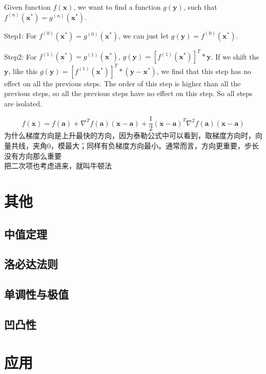 \documentclass[UTF8]{../../09-Mathematics}
\begin{document}
Given function $f(\boldsymbol x)$, we want to find a function $g(\boldsymbol y)$, such that $f^{(n)}(\boldsymbol x^*)=g^{(n)}(\boldsymbol x^*)$.

Step1: For $f^{(0)}(\boldsymbol x^*)=g^{(0)}(\boldsymbol x^*)$, we can just let $g(\boldsymbol y)=f^{(0)}(\boldsymbol x^*)$.

Step2: For $f^{(1)}(\boldsymbol x^*)=g^{(1)}(\boldsymbol x^*)$, $g(\boldsymbol y)=[f^{(1)}(\boldsymbol x^*)]^T *\boldsymbol y$. If we shift the $\boldsymbol y$, like this $g(\boldsymbol y)=[f^{(1)}(\boldsymbol x^*)]^T *(\boldsymbol y- \boldsymbol x^*)$, we find that this step has no effect on all the previous steps. The order of this step is higher than all the previous steps, so all the previous steps have no effect on this step. So all steps are isolated.

\begin{equation}
    f(\boldsymbol x) = f(\boldsymbol a)+
    \nabla ^T f(\boldsymbol a) (\boldsymbol x - \boldsymbol a) +
    \frac{1}{2} (\boldsymbol x - \boldsymbol a) ^T \nabla ^2 f(\boldsymbol a)(\boldsymbol x - \boldsymbol a)
\end{equation}
为什么梯度方向是上升最快的方向，因为泰勒公式中可以看到，取梯度方向时，向量共线，夹角0，模最大；同样有负梯度方向最小。通常而言，方向更重要，步长没有方向那么重要\\
把二次项也考虑进来，就叫牛顿法


\section{其他}
\subsection{中值定理}
\subsection{洛必达法则}
\subsection{单调性与极值}
\subsection{凹凸性}


\section{应用}
\end{document}
